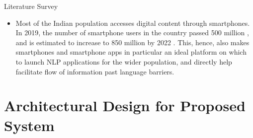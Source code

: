 \documentclass{beamer}
\begin{document}
\begin{frame}[allowframebreaks]{Literature Survey}
\begin{itemize}
		\item Most of the Indian population accesses digital content through smartphones. In 2019, the number of smartphone users in the country passed 500 million \cite{news18_2020}, and is estimated to increase to 850 million by 2022 \cite{www.ettelecom.com_2020}. This, hence, also makes smartphones and smartphone apps in particular an ideal platform on which to launch NLP applications for the wider population, and directly help facilitate flow of information past language barriers.
		\end{itemize} 
	\end{frame}

\section{Architectural Design for Proposed System}
\end{document}
